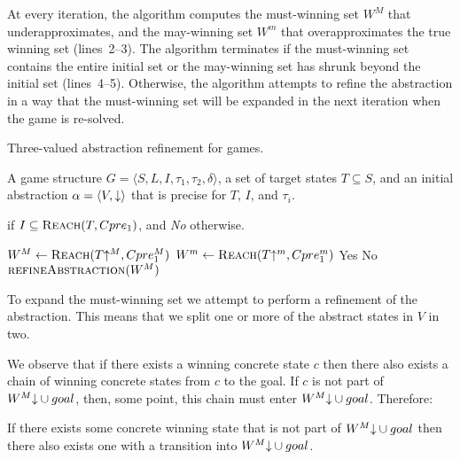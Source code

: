 At every iteration, the algorithm computes the must-winning set $W^M$ that underapproximates, and the may-winning set $W^m$ that overapproximates the true winning set (lines~2--3).  The algorithm terminates if the must-winning set contains the entire initial set or the may-winning set has shrunk beyond the initial set (lines~4--5).  Otherwise, the algorithm attempts to refine the abstraction in a way that the must-winning set will be expanded in the next iteration when the game is re-solved.

\begin{algorithm}
\caption{Three-valued abstraction refinement for games.}
\label{alg:generic}

\begin{algorithmic}[1]

\Require A game structure $G = \langle S, L, I, \tau_1, \tau_2, \delta \rangle$, a set 
of target states $T\subseteq S$, and an initial abstraction $\alpha=\langle V, \mathord{\downarrow} \rangle$
that is precise for $T$, $I$, and $\tau_i$.

 if $I \subseteq \textsc{Reach}(T, Cpre_1)$, and {\it No} otherwise.

    \Loop
        \State $W^M \gets \textsc{Reach}(T\mathord{\uparrow^M}, Cpre_1^M)$
        \State $W^m \gets \textsc{Reach}(T\mathord{\uparrow^m}, Cpre_1^m)$
         \label{alg:tvg:tc1}
            \State\Return Yes
         \label{alg:tvg:tc2}
            \State\Return No
        \Else       
            \State$\Call{refineAbstraction}{W^M}$
        \EndIf
    \EndLoop
\EndFunction

\end{algorithmic}
\end{algorithm}

To expand the must-winning set we attempt to perform a refinement of the abstraction. This means that we split one or more of the abstract states in $V$ in two. 

We observe that if there exists a winning concrete state $c$ then there also exists a chain of winning concrete states from $c$ to the goal. If $c$ is not part of $W^M\mathord{\downarrow} \cup goal$, then, some point, this chain must enter $W^M\mathord{\downarrow} \cup goal$. Therefore: 

\begin{thm}
If there exists some concrete winning state that is not part of $W^M\mathord{\downarrow} \cup goal$ then there also exists one with a transition into $W^M\mathord{\downarrow} \cup goal$. 
\end{thm}

